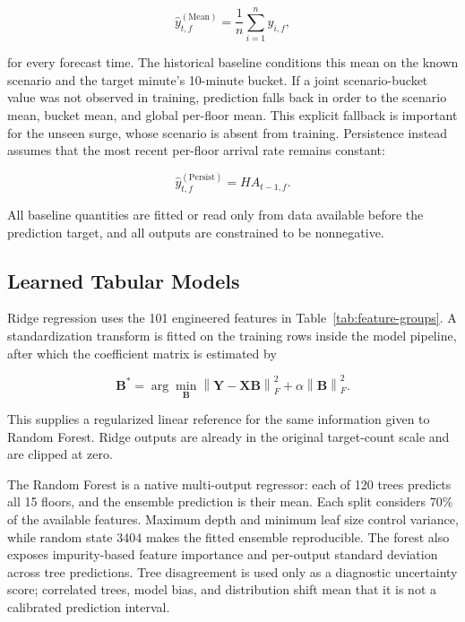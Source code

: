 \documentclass[12pt]{article}
\begin{document}
\begin{equation}
  \widehat{y}^{(\mathrm{Mean})}_{t,f}
  =\frac{1}{n}\sum_{i=1}^{n}y_{i,f},
  \label{eq:per-floor-mean}
\end{equation}

for every forecast time. The historical baseline conditions this mean on the
known scenario and the target minute's 10-minute bucket. If a joint
scenario-bucket value was not observed in training, prediction falls back in
order to the scenario mean, bucket mean, and global per-floor mean. This
explicit fallback is important for the unseen surge, whose scenario is absent
from training. Persistence instead assumes that the most recent per-floor
arrival rate remains constant:

\begin{equation}
  \widehat{y}^{(\mathrm{Persist})}_{t,f}=H A_{t-1,f}.
  \label{eq:persistence}
\end{equation}

All baseline quantities are fitted or read only from data available before the
prediction target, and all outputs are constrained to be nonnegative.

\subsection{Learned Tabular Models}

Ridge regression \cite{hoerl1970ridge} uses the 101 engineered features in
Table~\ref{tab:feature-groups}. A standardization transform is fitted on the
training rows inside the model pipeline, after which the coefficient matrix is
estimated by

\begin{equation}
  \mathbf{B}^{*}=\arg\min_{\mathbf{B}}
  \left\lVert\mathbf{Y}-\mathbf{X}\mathbf{B}\right\rVert_F^2
  +\alpha\left\lVert\mathbf{B}\right\rVert_F^2.
  \label{eq:ridge-objective}
\end{equation}

This supplies a regularized linear reference for the same information given to
Random Forest. Ridge outputs are already in the original target-count scale
and are clipped at zero.

The Random Forest \cite{breiman2001random} is a native multi-output regressor:
each of 120 trees predicts all 15 floors, and the ensemble prediction is their
mean. Each split
considers 70\% of the available features. Maximum depth and minimum leaf size
control variance, while random state 3404 makes the fitted ensemble
reproducible. The forest also exposes impurity-based feature importance and
per-output standard deviation across tree predictions. Tree disagreement is
used only as a diagnostic uncertainty score; correlated trees, model bias, and
distribution shift mean that it is not a calibrated prediction interval.
\end{document}
